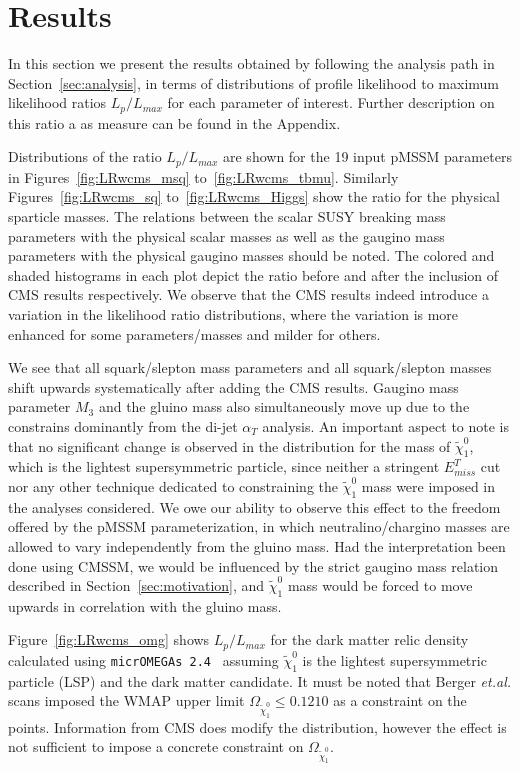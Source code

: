 \section{Results}
\label{sec:results}

In this section we present the results obtained by following the analysis path in Section~\ref{sec:analysis}, in terms of  distributions of profile likelihood to maximum likelihood ratios $L_p / L_{max}$ for each parameter of interest.  Further description on this ratio a as measure can be found in the Appendix.  

Distributions of the ratio $L_p/L_{max}$ are shown for the 19 input pMSSM parameters in Figures~\ref{fig:LRwcms_msq} to~\ref{fig:LRwcms_tbmu}.  Similarly Figures~\ref{fig:LRwcms_sq} to~\ref{fig:LRwcms_Higgs} show the ratio for the physical sparticle masses.  The relations between the scalar SUSY breaking mass parameters with the physical scalar masses as well as the gaugino mass parameters with the physical gaugino masses should be noted.  The colored and shaded histograms in each plot depict the ratio before and after the inclusion of CMS results respectively.  We observe that the CMS results indeed introduce a variation in the likelihood ratio distributions, where the variation is more enhanced for some parameters/masses and milder for others.  

We see that all squark/slepton mass parameters and all squark/slepton masses shift upwards systematically after adding the CMS results.  Gaugino mass parameter $M_3$ and the gluino mass also simultaneously move up due to the constrains dominantly from the di-jet $\alpha_T$ analysis.  An important aspect to note is that no significant change is observed in the distribution for the mass of $\tilde{\chi}^0_1$, which is the lightest supersymmetric particle, since neither a stringent $E^T_{miss}$ cut nor any other technique dedicated to constraining the $\tilde{\chi}^0_1$ mass were imposed in the analyses considered.  We owe our ability to observe this effect to the freedom offered by the pMSSM parameterization, in which neutralino/chargino masses are allowed to vary independently from the gluino mass.  Had the interpretation been done using CMSSM, we would be influenced by the strict gaugino mass relation described in Section~\ref{sec:motivation}, and $\tilde{\chi}^0_1$ mass would be forced to move upwards in correlation with the gluino mass.

Figure~\ref{fig:LRwcms_omg} shows $L_p/L_{max}$ for the dark matter relic density calculated using {\tt micrOMEGAs 2.4}~\cite{Belanger:2006is} assuming $\tilde{\chi}^0_1$ is the lightest supersymmetric particle (LSP) and the dark matter candidate.  It must be noted that Berger {\it et.al.} scans imposed the WMAP upper limit $\Omega_{\tilde{\chi}^0_1} \le 0.1210$ as a constraint on the points.  Information from CMS does modify the distribution, however the effect is not sufficient to impose a concrete constraint on $\Omega_{\tilde{\chi}^0_1}$.

